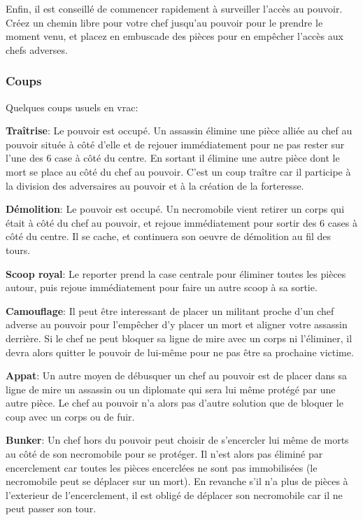 \documentclass{article}
\begin{document}
Enfin, il est conseillé de commencer rapidement à surveiller l'accès au pouvoir. Créez un chemin libre pour votre chef jusqu'au pouvoir pour le prendre le moment venu, et placez en embuscade
des pièces pour en empêcher l'accès aux chefs adverses.

\subsubsection{Coups}
Quelques coups usuels en vrac: 
\vspace{5pt} %

\textbf{Traîtrise}: Le pouvoir est occupé. Un assassin élimine une pièce alliée au chef au pouvoir située à côté d'elle et de rejouer immédiatement pour ne pas rester sur l'une des 6 case à côté du centre.
En sortant il élimine une autre pièce dont le mort se place au côté du chef au pouvoir.
C'est un coup traître car il participe à la division des adversaires au pouvoir et à la création de la forteresse.


\textbf{Démolition}: Le pouvoir est occupé. Un necromobile vient retirer un corps qui était à côté du chef au pouvoir, et rejoue immédiatement pour sortir des 6 cases à côté du centre.
Il se cache, et continuera son oeuvre de démolition au fil des tours.

\textbf{Scoop royal}: Le reporter prend la case centrale pour éliminer toutes les pièces autour, puis rejoue immédiatement pour faire un autre scoop à sa sortie.

\textbf{Camouflage}: Il peut être interessant de placer un militant proche d'un chef adverse au pouvoir pour l'empêcher d'y placer un mort et aligner votre assassin derrière. 
Si le chef ne peut bloquer sa ligne de mire avec un corps ni l'éliminer, 
il devra alors quitter le pouvoir de lui-même pour ne pas être sa prochaine victime.

\textbf{Appat}: Un autre moyen de débusquer un chef au pouvoir est de placer dans sa ligne de mire un assassin ou un diplomate qui sera lui même protégé par une autre pièce.
Le chef au pouvoir n'a alors pas d'autre solution que de bloquer le coup avec un corps ou de fuir.

\textbf{Bunker}: Un chef hors du pouvoir peut choisir de s'encercler lui même de morts au côté de son necromobile pour se protéger.
Il n'est alors pas éliminé par encerclement car toutes les pièces encerclées ne sont pas immobilisées (le necromobile peut se déplacer sur un mort).
En revanche s'il n'a plus de pièces à l'exterieur de l'encerclement, il est obligé de déplacer son necromobile car il ne peut passer son tour.
\end{document}
